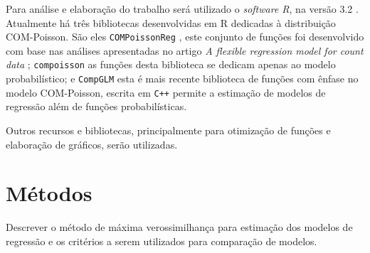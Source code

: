 \documentclass[
	12pt,				%
	openright,			%
	oneside,			%
	a4paper,			%
	english,			%
	brazil,				%
	]{abntex2}
\begin{document}
Para análise e elaboração do trabalho será utilizado o
\textit{software R}, na versão 3.2 \cite{Rcore2015}. 
Atualmente há três bibliotecas desenvolvidas em R dedicadas
à distribuição COM-Poisson. São eles \texttt{COMPoissonReg}
\cite{COMPoissonReg}, este conjunto de funções foi 
desenvolvido com base nas análises apresentadas no artigo
\textit{A flexible regression model for count data} 
\cite{Sellers2010}; \texttt{compoisson} as funções desta 
biblioteca se dedicam apenas ao modelo probabilístico; e
\texttt{CompGLM} esta é mais recente biblioteca de funções 
com ênfase no modelo COM-Poisson, escrita em \texttt{C++}
permite a estimação de modelos de regressão além de funções 
probabilísticas.

Outros recursos e bibliotecas, principalmente para 
otimização de funções e elaboração de gráficos, serão 
utilizadas.

\section{Métodos}

Descrever o método de máxima verossimilhança para estimação 
dos modelos de regressão e os critérios a serem utilizados 
para comparação de modelos.
\end{document}
